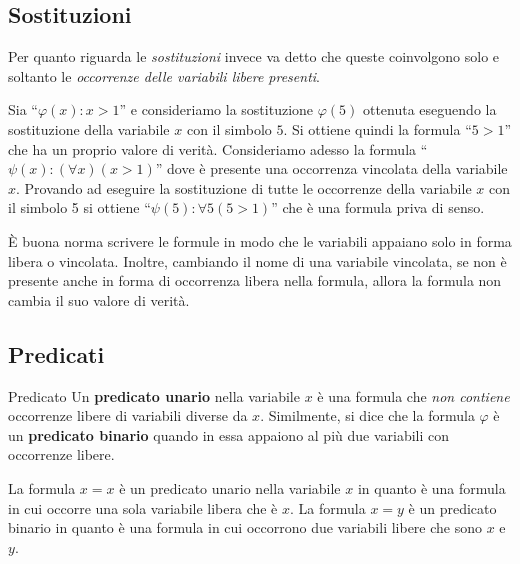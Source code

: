 \subsection{Sostituzioni}
Per quanto riguarda le \textit{sostituzioni} invece va detto che queste coinvolgono solo e soltanto le \textit{occorrenze delle variabili libere presenti}.

\begin{example}
	Sia ``$\varphi(x) : x > 1$'' e consideriamo la sostituzione $\varphi(5)$ ottenuta eseguendo la sostituzione della variabile $x$ con il simbolo $5$. Si ottiene quindi la formula ``$5 > 1 $'' che ha un proprio valore di verità. Consideriamo adesso la formula ``$\psi(x) : (\forall x) (x>1)$'' dove è presente una occorrenza vincolata della variabile $x$. Provando ad eseguire la sostituzione di tutte le occorrenze della variabile $x$ con il simbolo 5 si ottiene ``$ \psi(5) : \forall 5 (5>1)$'' che è una formula priva di senso.
\end{example}

È buona norma scrivere le formule in modo che le variabili appaiano solo in forma libera o vincolata. Inoltre, cambiando il nome di una variabile vincolata, se non è presente anche in forma di occorrenza libera nella formula, allora la formula non cambia il suo valore di verità.

\subsection{Predicati}

\begin{defbox}{Predicato}
	Un \textbf{predicato unario} nella variabile $x$ è una formula che \textit{non contiene} occorrenze libere di variabili diverse da $x$. Similmente, si dice che la formula $\varphi$ è un \textbf{predicato binario} quando in essa appaiono al più due variabili con occorrenze libere.
\end{defbox}

\begin{example}
	La formula $x=x$ è un predicato unario nella variabile $x$ in quanto è una formula in cui occorre una sola variabile libera che è $x$. La formula $x=y$ è un predicato binario in quanto è una formula in cui occorrono due variabili libere che sono $x$ e $y$.
\end{example}

